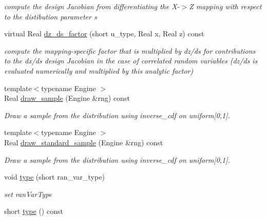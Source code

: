\begin{DoxyCompactItemize}
\begin{DoxyCompactList}\small\item\em compute the design Jacobian from differentiating the X-\/$>$Z mapping with respect to the distibution parameter s \end{DoxyCompactList}\item 
virtual Real \hyperlink{classPecos_1_1RandomVariable_af6b5fc528523180bed5fc3008dcea205}{dz\+\_\+ds\+\_\+factor} (short u\+\_\+type, Real x, Real z) const \label{classPecos_1_1RandomVariable_af6b5fc528523180bed5fc3008dcea205}

\begin{DoxyCompactList}\small\item\em compute the mapping-\/specific factor that is multiplied by dz/ds for contributions to the dx/ds design Jacobian in the case of correlated random variables (dz/ds is evaluated numerically and multiplied by this analytic factor) \end{DoxyCompactList}\item 
{\footnotesize template$<$typename Engine $>$ }\\Real \hyperlink{classPecos_1_1RandomVariable_a5d75f2c65d8cf00d9c110ce19f692032}{draw\+\_\+sample} (Engine \&rng) const \label{classPecos_1_1RandomVariable_a5d75f2c65d8cf00d9c110ce19f692032}

\begin{DoxyCompactList}\small\item\em Draw a sample from the distribution using inverse\+\_\+cdf on uniform\mbox{[}0,1\mbox{]}. \end{DoxyCompactList}\item 
{\footnotesize template$<$typename Engine $>$ }\\Real \hyperlink{classPecos_1_1RandomVariable_aeaf087e00e5b7c1de93d60122c1a5794}{draw\+\_\+standard\+\_\+sample} (Engine \&rng) const \label{classPecos_1_1RandomVariable_aeaf087e00e5b7c1de93d60122c1a5794}

\begin{DoxyCompactList}\small\item\em Draw a sample from the distribution using inverse\+\_\+cdf on uniform\mbox{[}0,1\mbox{]}. \end{DoxyCompactList}\item 
void \hyperlink{classPecos_1_1RandomVariable_a788e9fac7035376ecb491e2eb059b421}{type} (short ran\+\_\+var\+\_\+type)\label{classPecos_1_1RandomVariable_a788e9fac7035376ecb491e2eb059b421}

\begin{DoxyCompactList}\small\item\em set ran\+Var\+Type \end{DoxyCompactList}\item 
short \hyperlink{classPecos_1_1RandomVariable_abfc4be6e339306f830bbbedf8ba5cf97}{type} () const \label{classPecos_1_1RandomVariable_abfc4be6e339306f830bbbedf8ba5cf97}


\end{DoxyCompactItemize}
